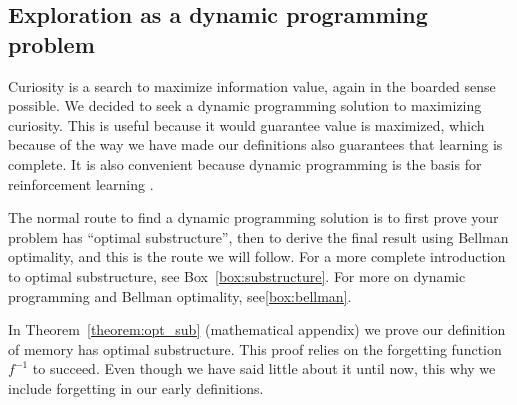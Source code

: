 \subsection{Exploration as a dynamic programming problem}
Curiosity is a search to maximize information value, again in the boarded sense possible. We decided to seek a dynamic programming solution to maximizing curiosity. This is useful because it would guarantee value is maximized, which because of the way we have made our definitions also guarantees that learning is complete. It is also convenient because dynamic programming is the basis for reinforcement learning \cite{Sutton2018}. 

The normal route to find a dynamic programming solution is to first prove your problem has ``optimal substructure'', then to derive the final result using Bellman optimality, and this is the route we will follow. For a more complete introduction to optimal substructure, see Box~\ref{box:substructure}. For more on dynamic programming and Bellman optimality, see\ref{box:bellman}. 

In Theorem~\ref{theorem:opt_sub} (mathematical appendix) we prove our definition of memory has optimal substructure. This proof relies on the forgetting function $f^{-1}$ to succeed. Even though we have said little about it until now, this why we include forgetting in our early definitions. 

